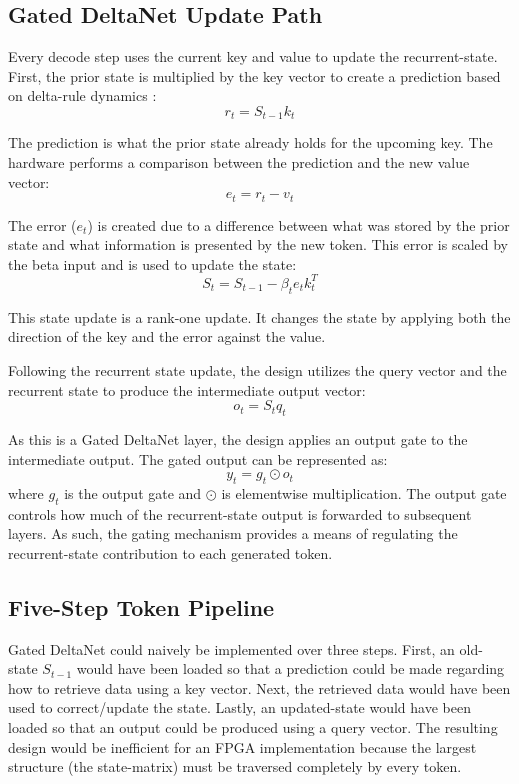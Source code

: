 ﻿\documentclass[conference]{IEEEtran}
\begin{document}
\subsection{Gated DeltaNet Update Path}
Every decode step uses the current key and value to update the recurrent-state. First, the prior state is multiplied by the key vector to create a prediction based on delta-rule dynamics \cite{b3}:
\begin{equation}
r_t = S_{t-1} k_t
\end{equation}

The prediction is what the prior state already holds for the upcoming key. The hardware performs a comparison between the prediction and the new value vector:
\begin{equation}
e_t = r_t - v_t
\end{equation}

The error ($e_t$) is created due to a difference between what was stored by the prior state and what information is presented by the new token. This error is scaled by the beta input and is used to update the state:
\begin{equation}
S_t = S_{t-1} - \beta_t e_t k_t^T
\end{equation}

This state update is a rank-one update. It changes the state by applying both the direction of the key and the error against the value.

Following the recurrent state update, the design utilizes the query vector and the recurrent state to produce the intermediate output vector:
\begin{equation}
o_t = S_t q_t
\end{equation}

As this is a Gated DeltaNet layer, the design applies an output gate to the intermediate output. The gated output can be represented as:
\begin{equation}
y_t = g_t \odot o_t
\end{equation}
where $g_t$ is the output gate and $\odot$ is elementwise multiplication. The output gate controls how much of the recurrent-state output is forwarded to subsequent layers. As such, the gating mechanism provides a means of regulating the recurrent-state contribution to each generated token.

\subsection{Five-Step Token Pipeline}
Gated DeltaNet could naively be implemented over three steps. First, an old-state $S_{t-1}$ would have been loaded so that a prediction could be made regarding how to retrieve data using a key vector. Next, the retrieved data would have been used to correct/update the state. Lastly, an updated-state would have been loaded so that an output could be produced using a query vector. The resulting design would be inefficient for an FPGA implementation because the largest structure (the state-matrix) must be traversed completely by every token.
\end{document}
